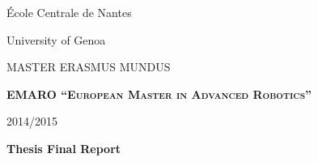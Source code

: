 \documentclass[11pt, openright]{Thesis} %
\begin{document}
\setcounter{tocdepth}{2}
\begin{titlepage}
\singlespacing
     \noindent \begin{minipage}{0.5\textwidth}
	\begin{flushleft} 
	{\large \'{E}cole Centrale de Nantes}
	\end{flushleft}
	\end{minipage}
	\begin{minipage}{0.5\textwidth}
	\begin{flushright}
	{\large University of Genoa}
    \end{flushright}	 
	\end{minipage}
\begin{figure}[H]
\center
\end{figure}
	\begin{center}
	\vspace*{0.2in}
	{\Large MASTER ERASMUS MUNDUS}
	
	\vspace{0.2in}	\textbf{\textsc{EMARO  ``European Master in Advanced Robotics''}}
	
	\vspace{0.2in}	
	
	2014/2015
	
	\vspace{0.2in}
	
	\large \textbf{Thesis Final Report}
	
	\vspace{0.3in}
	

\end{center}
\end{titlepage}
\end{document}
